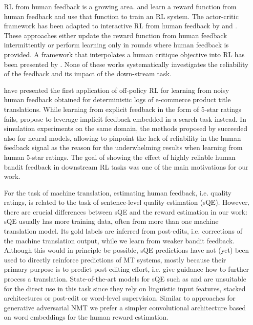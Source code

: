 RL from human feedback is a growing area. \citet{KnoxStone:09} and \citet{ChristianoETAL:17} learn a reward function from human feedback and use that function to train an RL system. The actor-critic framework has been adapted to interactive RL from human feedback by \citet{PilarskiETAL:11} and \citet{MacGlashanETAL:17}. These approaches either update the reward function from human feedback intermittently or perform learning only in rounds where human feedback is provided. A framework that interpolates a human critique objective into RL has been presented by \citet{JudahETAL:10}. None of these works systematically investigates the reliability of the feedback and its impact of the down-stream task.

\citet{KreutzerETAL:18} have presented the first application of off-policy RL for learning from noisy human feedback obtained for deterministic logs of e-commerce product title translations. While learning from explicit feedback in the form of 5-star ratings fails, \citet{KreutzerETAL:18} propose to leverage implicit feedback embedded in a search task instead. In simulation experiments on the same domain, the methods proposed by \citet{LawrenceETAL:17} succeeded also for neural models, allowing to pinpoint the lack of reliability in the human feedback signal as the reason for the underwhelming results when learning from human 5-star ratings. The goal of showing the effect of highly reliable human bandit feedback in downstream RL tasks was one of the main motivations for our work.

For the task of machine translation, estimating human feedback, i.e. quality ratings, is related to the task of sentence-level quality estimation (sQE). However, there are crucial differences between sQE and the reward estimation in our work: sQE usually has more training data, often from more than one machine translation model. Its gold labels are inferred from post-edits, i.e. corrections of the machine translation output, while we learn from weaker bandit feedback. Although this would in principle be possible, sQE predictions have not (yet) been used to directly reinforce predictions of MT systems, mostly because their primary purpose is to predict post-editing effort, i.e. give guidance how to further process a translation. State-of-the-art models for sQE such as \cite{MartinsETAL:17} and \cite{KimETAL:17} are unsuitable for the direct use in this task since they rely on linguistic input features, stacked architectures or post-edit or word-level supervision. Similar to approaches for generative adversarial NMT \cite{YuETAL:17, WuETAL:17} we prefer a simpler convolutional architecture based on word embeddings for the human reward estimation.

